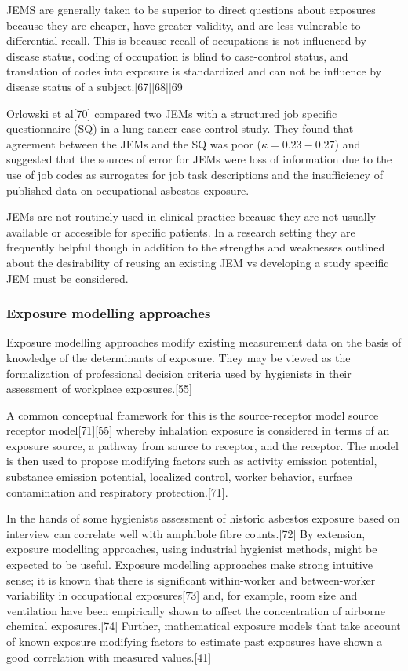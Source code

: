 \documentclass[12pt,a4paper,]{report}
\begin{document}
JEMS are generally taken to be superior to direct questions about
exposures because they are cheaper, have greater validity, and are less
vulnerable to differential recall. This is because recall of occupations
is not influenced by disease status, coding of occupation is blind to
case-control status, and translation of codes into exposure is
standardized and can not be influence by disease status of a
subject.{[}67{]}{[}68{]}{[}69{]}

Orlowski et al{[}70{]} compared two JEMs with a structured job specific
questionnaire (SQ) in a lung cancer case-control study. They found that
agreement between the JEMs and the SQ was poor
(\ensuremath{\kappa = 0.23-0.27}) and suggested that the sources of
error for JEMs were loss of information due to the use of job codes as
surrogates for job task descriptions and the insufficiency of published
data on occupational asbestos exposure.

JEMs are not routinely used in clinical practice because they are not
usually available or accessible for specific patients. In a research
setting they are frequently helpful though in addition to the strengths
and weaknesses outlined about the desirability of reusing an existing
JEM vs developing a study specific JEM must be considered.

\hypertarget{exposure-modelling-approaches}{%
\subsubsection{Exposure modelling
approaches}\label{exposure-modelling-approaches}}

Exposure modelling approaches modify existing measurement data on the
basis of knowledge of the determinants of exposure. They may be viewed
as the formalization of professional decision criteria used by
hygienists in their assessment of workplace exposures.{[}55{]}

A common conceptual framework for this is the source-receptor model
source receptor model{[}71{]}{[}55{]} whereby inhalation exposure is
considered in terms of an exposure source, a pathway from source to
receptor, and the receptor. The model is then used to propose modifying
factors such as activity emission potential, substance emission
potential, localized control, worker behavior, surface contamination and
respiratory protection.{[}71{]}.

In the hands of some hygienists assessment of historic asbestos exposure
based on interview can correlate well with amphibole fibre
counts.{[}72{]} By extension, exposure modelling approaches, using
industrial hygienist methods, might be expected to be useful. Exposure
modelling approaches make strong intuitive sense; it is known that there
is significant within-worker and between-worker variability in
occupational exposures{[}73{]} and, for example, room size and
ventilation have been empirically shown to affect the concentration of
airborne chemical exposures.{[}74{]} Further, mathematical exposure
models that take account of known exposure modifying factors to estimate
past exposures have shown a good correlation with measured
values.{[}41{]}
\end{document}
